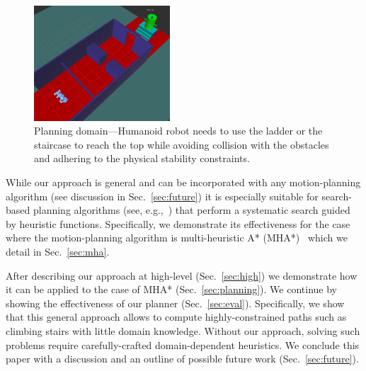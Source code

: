 \documentclass{article}
\begin{document}
\begin{figure}[tb]
  \centering
  	\includegraphics[width=0.453\textwidth]{fig/env.png}
  \caption{
		Planning domain---Humanoid robot needs to use the ladder or the staircase to reach the top while avoiding collision with the obstacles and adhering to the physical stability constraints.
}
   	\label{fig:robot}
\end{figure}



%

While our approach is general and can be incorporated with any motion-planning algorithm (see discussion in Sec.~\ref{sec:future}) it is especially suitable for search-based planning algorithms (see, e.g.,~\cite{CCL14}) that perform a systematic search guided by heuristic functions.
Specifically, we demonstrate its effectiveness for the case where the motion-planning algorithm is multi-heuristic A* (MHA*)~\cite{ASNHL16,NAL15} which we detail in Sec.~\ref{sec:mha}.




After describing our approach at high-level (Sec.~\ref{sec:high}) we demonstrate how it can be applied to the case of MHA* (Sec.~\ref{sec:planning}).
We continue by showing the effectiveness of our planner (Sec.~\ref{sec:eval}).
Specifically, we show that this general approach allows to compute highly-constrained paths such as climbing stairs with little domain knowledge.
Without our approach, solving such problems require carefully-crafted domain-dependent heuristics. 
We conclude this paper with a discussion and an outline of possible future work (Sec.~\ref{sec:future}).
\end{document}
